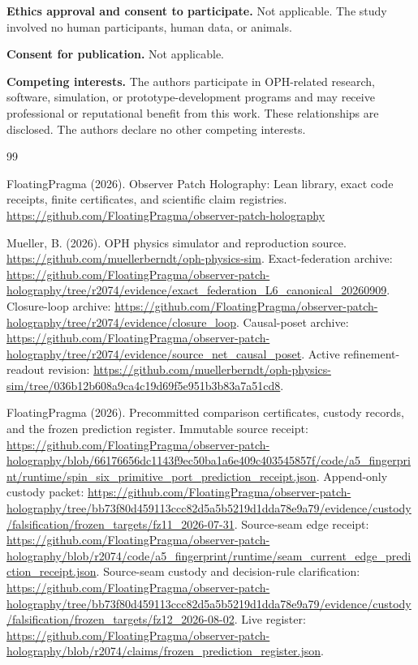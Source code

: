 \documentclass[11pt]{article}
\theoremstyle{definition}
\theoremstyle{remark}
\begin{document}
\noindent\textbf{Ethics approval and consent to participate.}
Not applicable. The study involved no human participants, human data, or
animals.

\noindent\textbf{Consent for publication.}
Not applicable.

\noindent\textbf{Competing interests.}
The authors participate in OPH-related research, software, simulation, or
prototype-development programs and may receive professional or reputational
benefit from this work. These relationships are disclosed. The authors declare
no other competing interests.

{\footnotesize
{}
\begin{thebibliography}{99}
\setlength{\itemsep}{0pt}\setlength{\parsep}{0pt}

FloatingPragma (2026). Observer Patch Holography: Lean library, exact code
receipts, finite certificates, and scientific claim registries.
\url{https://github.com/FloatingPragma/observer-patch-holography}

Mueller, B. (2026). OPH physics simulator and reproduction source.
\url{https://github.com/muellerberndt/oph-physics-sim}.
Exact-federation archive:
\url{https://github.com/FloatingPragma/observer-patch-holography/tree/r2074/evidence/exact_federation_L6_canonical_20260909}.
Closure-loop archive:
\url{https://github.com/FloatingPragma/observer-patch-holography/tree/r2074/evidence/closure_loop}.
Causal-poset archive:
\url{https://github.com/FloatingPragma/observer-patch-holography/tree/r2074/evidence/source_net_causal_poset}.
Active refinement-readout revision:
\url{https://github.com/muellerberndt/oph-physics-sim/tree/036b12b608a9ca4c19d69f5e951b3b83a7a51cd8}.

FloatingPragma (2026). Precommitted comparison certificates, custody
records, and the frozen prediction register.
Immutable source receipt:
\url{https://github.com/FloatingPragma/observer-patch-holography/blob/66176656dc1143f9ec50ba1a6e409c403545857f/code/a5_fingerprint/runtime/spin_six_primitive_port_prediction_receipt.json}.
Append-only custody packet:
\url{https://github.com/FloatingPragma/observer-patch-holography/tree/bb73f80d459113ccc82d5a5b5219d1dda78e9a79/evidence/custody/falsification/frozen_targets/fz11_2026-07-31}.
Source-seam edge receipt:
\url{https://github.com/FloatingPragma/observer-patch-holography/blob/r2074/code/a5_fingerprint/runtime/seam_current_edge_prediction_receipt.json}.
Source-seam custody and decision-rule clarification:
\url{https://github.com/FloatingPragma/observer-patch-holography/tree/bb73f80d459113ccc82d5a5b5219d1dda78e9a79/evidence/custody/falsification/frozen_targets/fz12_2026-08-02}.
Live register:
\url{https://github.com/FloatingPragma/observer-patch-holography/blob/r2074/claims/frozen_prediction_register.json}.


\end{thebibliography}}
\end{document}
